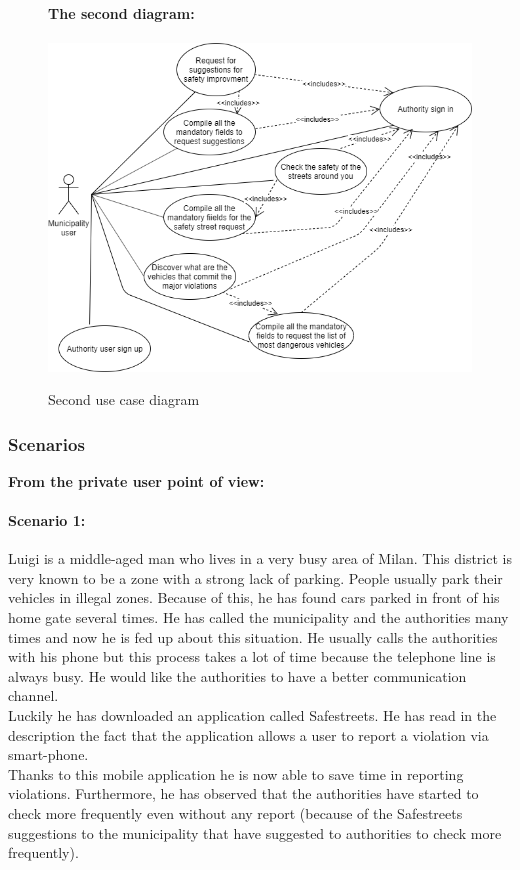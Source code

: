\documentclass[titlepage]{article}
\begin{document}
\begin{figure}[h]
	\textbf{The second diagram:\\ \\ }
	\includegraphics[scale=0.65]{use case diagrams/use-case2.png}
	\centering
	\caption{Second use case diagram}
\end{figure}
\FloatBarrier

\subsubsection{Scenarios}
\begin{center}
\textbf{From the private user point of view:}
\end{center}

\paragraph{Scenario 1:}Luigi is a middle-aged man who lives in a very busy area of Milan. This district is very known to be a zone with a strong lack of parking. People usually park their vehicles in illegal zones.
Because of this, he has found  cars parked in front of his home gate several times. He has called the municipality and the authorities many times and now he is fed up about this situation. He usually calls the authorities with his phone but this process takes a lot of time because the telephone line is always busy. He would like the authorities to have a better communication channel.\\Luckily he has downloaded an application called Safestreets. He has read in the description the fact that the application allows a user to report a violation via smart-phone.\\
Thanks to this mobile application he is now able to save time in reporting violations. Furthermore, he has observed that  the authorities have started to check more frequently even without any report (because of the Safestreets suggestions to the municipality that have suggested to authorities to check more frequently).
\end{document}
